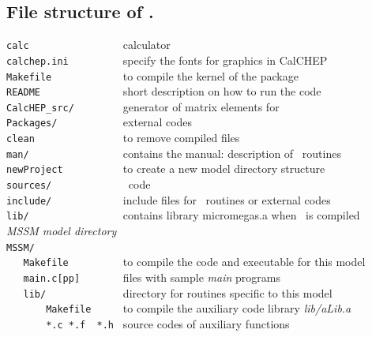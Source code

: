 \documentclass[12pt,a4paper]{article}
\begin{document}
\subsection{File structure of \micro.}
\label{file_structure}
\verb|calc                | calculator\\
\verb|calchep.ini         | specify the fonts for graphics in CalCHEP\\
\verb|Makefile            |  to compile the kernel of the package               \\
\verb|README              | short description on how to run the code\\
\verb|CalcHEP_src/        |        generator of matrix elements for \micro   \\
\verb|Packages/           |        external codes    \\
\verb|clean               | to remove compiled files \\
\verb|man/                |    contains the manual: description of \micro\ routines \\
\verb|newProject          |     to create a new model directory   structure                           \\
\verb|sources/            |        \micro\ code                               \\
\verb|include/            |        include files for \micro\ routines or external codes                              \\
\verb|lib/                |        contains library micromegas.a when \micro\ is compiled                               \\
{\it MSSM model directory}                                                          \\
\verb|MSSM/               |                                                      \\
\verb|   Makefile         |  to compile the code and executable for  this model \\
\verb|   main.c[pp]       |       files with sample {\it main} programs      \\
\verb|   lib/             |      directory for routines specific to this model   \\
\verb|       Makefile     |   to compile the auxiliary code library {\it lib/aLib.a}    \\
\verb|       *.c *.f  *.h |      source codes of auxiliary functions             \\
\end{document}
